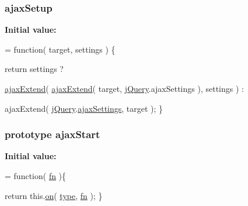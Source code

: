 \subsubsection[{ajax\+Setup}]{ ajax\+Setup}\label{jquery-1_810_82-vsdoc_8js_a3b12f4f2a83dfdae4e81bcaeaf2a2f42}
{\bfseries Initial value\+:}
\begin{DoxyCode}
= \textcolor{keyword}{function}( target, settings ) \{


        \textcolor{keywordflow}{return} settings ?

            
            \hyperlink{_bibabook_2_scripts_2jquery-1_810_82_8js_a113ade43cfd5328ebd5ccc84f45fe4de}{ajaxExtend}( \hyperlink{_bibabook_2_scripts_2jquery-1_810_82_8js_a113ade43cfd5328ebd5ccc84f45fe4de}{ajaxExtend}( target, \hyperlink{jquery-1_810_82-vsdoc_8js_add5237586d970a38a81f990e8eb28c6c}{jQuery}.ajaxSettings ), settings ) :

            
            ajaxExtend( \hyperlink{jquery-1_810_82-vsdoc_8js_add5237586d970a38a81f990e8eb28c6c}{jQuery}.\hyperlink{jquery-1_810_82-vsdoc_8js_adcbb4ce9148aaf3a9a165b2ac462163b}{ajaxSettings}, target );
    \}
\end{DoxyCode}
\hypertarget{jquery-1_810_82-vsdoc_8js_af53db176b2b7bf3cd611342f2e94309a}{}
\subsubsection[{ajax\+Start}]{ {\bf prototype} ajax\+Start}\label{jquery-1_810_82-vsdoc_8js_af53db176b2b7bf3cd611342f2e94309a}
{\bfseries Initial value\+:}
\begin{DoxyCode}
= \textcolor{keyword}{function}( \hyperlink{jquery-1_810_82-vsdoc_8js_acef6bdaf6b9b20fdcca1ea86f0902c3b}{fn} )\{


        \textcolor{keywordflow}{return} this.\hyperlink{jquery-1_810_82-vsdoc_8js_ae453b412b883f60220d73468ef6c6dbc}{on}( \hyperlink{jquery-1_810_82-vsdoc_8js_a3940565e83a9bfd10d95ffd27536da91}{type}, \hyperlink{jquery-1_810_82-vsdoc_8js_acef6bdaf6b9b20fdcca1ea86f0902c3b}{fn} );
    \}
\end{DoxyCode}
\hypertarget{jquery-1_810_82-vsdoc_8js_aa7def3398102d590e9f9062d44dbcaff}{}
